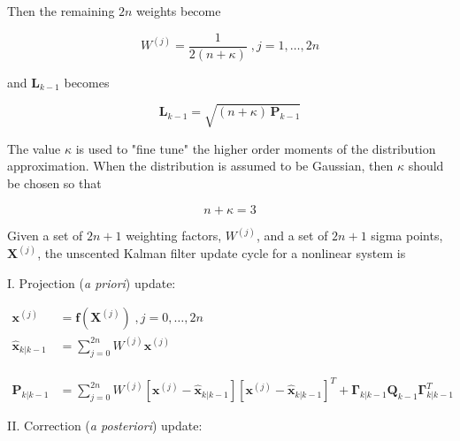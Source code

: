 Then the remaining $2n$ weights become

\begin{equation*}
    W^{(j)} = \frac{1}{2 (n + \kappa)} \; , j=1,\dots,2n
\end{equation*}

and $\mathbf{L}_{k-1}$ becomes

\begin{equation*}
    \mathbf{L}_{k-1} = \sqrt{ (n + \kappa) \, \mathbf{P}_{k-1} }
\end{equation*}

The value $\kappa$ is used to "fine tune" the higher order moments of the distribution
approximation. When the distribution is assumed to be Gaussian, then $\kappa$ should be
chosen so that

\begin{equation*}
    n + \kappa = 3
\end{equation*}

Given a set of $2n + 1$ weighting factors, $W^{(j)}$, and a set of $2n + 1$ sigma points,
$\mathbf{X}^{(j)}$, the unscented Kalman filter update cycle for a nonlinear system is

I. Projection (\textit{a priori}) update:

\begin{equation*}
    \begin{aligned}
        \mathbf{x}^{(j)} &= \mathbf{f} \left( \mathbf{X}^{(j)} \right) \; , j=0,\dots,2n \\
        \hat{\mathbf{x}}_{k|k-1} &= \sum_{j=0}^{2n} W^{(j)} \mathbf{x}^{(j)} \\
        \phantom{X} \\
        \mathbf{P}_{k|k-1} &= \sum_{j=0}^{2n} W^{(j)} \left[ \mathbf{x}^{(j)} - \hat{\mathbf{x}}_{k|k-1} \right] \left[ \mathbf{x}^{(j)} - \hat{\mathbf{x}}_{k|k-1} \right]^T
        + \mathbf{\Gamma}_{k|k-1} \mathbf{Q}_{k-1} \mathbf{\Gamma}_{k|k-1}^T
    \end{aligned}
\end{equation*}

II. Correction (\textit{a posteriori}) update:


